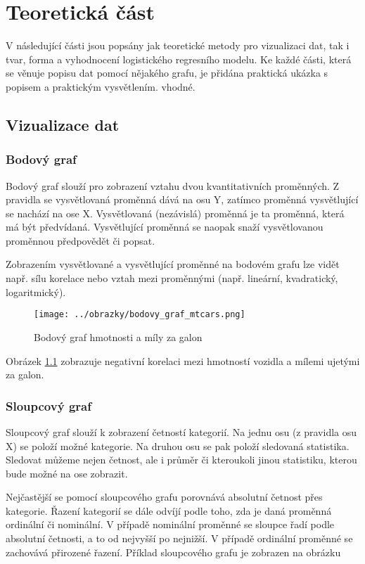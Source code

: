 \chapter{Teoretická část}
V následující části jsou popsány jak teoretické metody pro vizualizaci dat, tak i tvar, forma a vyhodnocení logistického regresního modelu. 
Ke každé části, která se věnuje popisu dat pomocí nějakého grafu, je přidána praktická ukázka s popisem a praktickým vysvětlením.
vhodné.

\section{Vizualizace dat} \label{sec:vizualizace_dat}
\subsection{Bodový graf}
Bodový graf slouží pro zobrazení vztahu dvou kvantitativních proměnných. Z pravidla se vysvětlovaná proměnná dává na osu Y,
zatímco proměnná vysvětlující se nachází na ose X. Vysvětlovaná (nezávislá) proměnná je ta proměnná, která má být předvídaná.
Vysvětlující proměnná se naopak snaží vysvětlovanou proměnnou předpovědět či popsat. 

Zobrazením
vysvětlované a vysvětlující proměnné
na bodovém grafu lze vidět např. sílu korelace nebo vztah mezi proměnnými (např. lineární, kvadratický, logaritmický).

\begin{figure}[H]
    \centering
    \texttt{[image: ../obrazky/bodovy\_graf\_mtcars.png]}
    \caption{Bodový graf hmotnosti a míly za galon} 
    \label{fig:bodovy_graf_mtcars}
\end{figure}

Obrázek \ref{fig:bodovy_graf_mtcars} zobrazuje negativní korelaci mezi hmotností vozidla a mílemi ujetými za galon.

\subsection{Sloupcový graf}
Sloupcový graf slouží k zobrazení četností
kategorií. Na jednu osu (z pravidla osu X) se položí možné kategorie. Na druhou osu
se pak položí sledovaná statistika.
Sledovat můžeme nejen četnost, ale i průměr či kteroukoli jinou statistiku, kterou bude možné na ose zobrazit.

Nejčastější se pomocí sloupcového grafu porovnává absolutní četnost přes kategorie. Řazení kategorií se dále odvíjí podle toho, zda je
daná proměnná ordinální či nominální. V případě nominální proměnné se sloupce řadí podle absolutní četnosti, a to od nejvyšší po nejnižší.
V případě ordinální proměnné se zachovává přirozené řazení. Příklad sloupcového grafu je zobrazen na obrázku 

